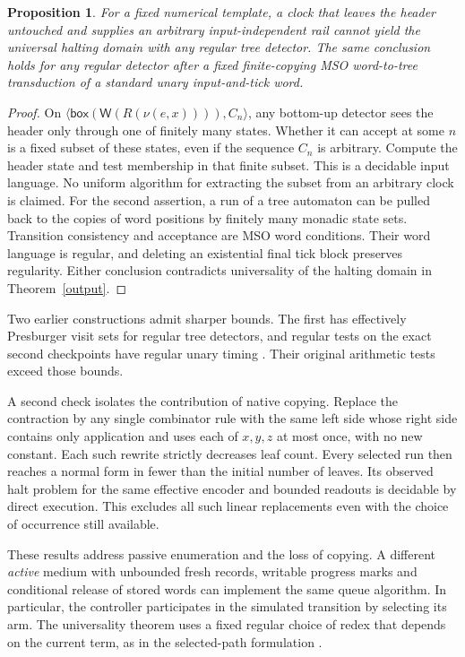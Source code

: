 \documentclass[11pt,letterpaper,oneside,reqno]{amsart}
\newtheorem{prop}[theorem]{Proposition}
\newcommand{\pair}[2]{\langle #1,#2\rangle}
\newcommand{\word}{\mathsf W}
\newcommand{\bx}[1]{\mathsf{box}(#1)}
\begin{document}
\begin{prop}\label{clock}
For a fixed numerical template, a clock that leaves the header untouched and supplies an arbitrary input-independent rail cannot yield the universal halting domain with \emph{any} regular tree detector. The same conclusion holds for any regular detector after a fixed finite-copying MSO word-to-tree transduction of a standard unary input-and-tick word.
\end{prop}
\begin{proof}
On \(\pair{\bx{\word(R(\nu(e,x)))}}{C_n}\), any bottom-up detector sees the header only through one of finitely many states. Whether it can accept at some \(n\) is a fixed subset of these states, even if the sequence \(C_n\) is arbitrary. Compute the header state and test membership in that finite subset. This is a decidable input language. No uniform algorithm for extracting the subset from an arbitrary clock is claimed. For the second assertion, a run of a tree automaton can be pulled back to the copies of word positions by finitely many monadic state sets. Transition consistency and acceptance are MSO word conditions. Their word language is regular, and deleting an existential final tick block preserves regularity. Either conclusion contradicts universality of the halting domain in Theorem~\ref{output}.
\end{proof}

Two earlier constructions admit sharper bounds. The first has effectively Presburger visit sets for regular tree detectors, and regular tests on the exact second checkpoints have regular unary timing \cite{generator,replacement}. Their original arithmetic tests exceed those bounds.

A second check isolates the contribution of native copying. Replace the contraction by any single combinator rule with the same left side whose right side contains only application and uses each of \(x,y,z\) at most once, with no new constant. Each such rewrite strictly decreases leaf count. Every selected run then reaches a normal form in fewer than the initial number of leaves. Its observed halt problem for the same effective encoder and bounded readouts is decidable by direct execution. This excludes all such linear replacements even with the choice of occurrence still available.

These results address passive enumeration and the loss of copying. A different \emph{active} medium with unbounded fresh records, writable progress marks and conditional release of stored words can implement the same queue algorithm. In particular, the controller participates in the simulated transition by selecting its arm. The universality theorem uses a fixed regular choice of redex that depends on the current term, as in the selected-path formulation \cite{announcement,prize}.
\end{document}
